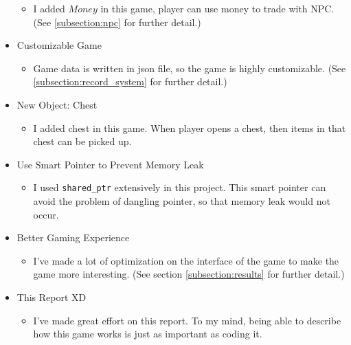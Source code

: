\documentclass{article}
\begin{document}
\begin{itemize}
\begin{itemize}
            \item I added $Money$ in this game, player can use money to trade with NPC. (See \ref{subsection:npc} for further detail.)
        \end{itemize}
        \item Customizable Game
        \begin{itemize}
            \item Game data is written in json file, so the game is highly customizable. (See \ref{subsection:record_system} for further detail.)
        \end{itemize}
        \item New Object: Chest
        \begin{itemize}
            \item I added chest in this game. When player opens a chest, then items in that chest can be picked up.
        \end{itemize}
        \item Use Smart Pointer to Prevent Memory Leak
        \begin{itemize}
            \item I used \texttt{shared\_ptr} extensively in this project. This smart pointer can avoid the problem of dangling pointer, so that memory leak would not occur.
        \end{itemize}
        \item Better Gaming Experience
        \begin{itemize}
            \item I've made a lot of optimization on the interface of the game to make the game more interesting. (See section \ref{subsection:results} for further detail.)
        \end{itemize}
        \item This Report XD
        \begin{itemize}
            \item I've made great effort on this report. To my mind, being able to describe how this game works is just as important as coding it.
        \end{itemize}
    \end{itemize}
\end{document}
